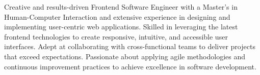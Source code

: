 

\begin{cvparagraph}

Creative and results-driven Frontend Software Engineer with a Master’s in Human-Computer Interaction and extensive experience in designing and implementing user-centric web applications. Skilled in leveraging the latest frontend technologies to create responsive, intuitive, and accessible user interfaces. Adept at collaborating with cross-functional teams to deliver projects that exceed expectations. Passionate about applying agile methodologies and continuous improvement practices to achieve excellence in software development.
\end{cvparagraph}
